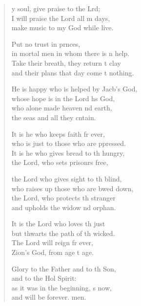 \settowidth{\versewidth}{He is happy who is helped by Jacob’s God, *}
\begin{verse}%
  \begin{patverse}
y soul, give praise to the Lrd;\Flex\\
I will praise the Lord all m days,\Med\\
make music to my God while  live.

Put no trust in prnces,\Med\\
in mortal men in whom there is n help.\\
Take their breath, they return t clay\Med\\
and their plans that day come t nothing.

He is happy who is helped by Jacb’s God,\Med\\
whose hope is in the Lord h\pointup{\i}s God,\\
who alone made heaven nd earth,\Med\\
the seas and all they cntain.

It is he who keeps faith fr ever,\Med\\
who is just to those who are ppressed.\\
It is he who gives bread to th hungry,\Med\\
the Lord, who sets prisonrs free,

the Lord who gives sight to th blind,\Med\\
who raises up those who are bwed down,\\
the Lord, who protects th stranger\Med\\
and upholds the widow nd orphan.

It is the Lord who loves th just\Med\\
but thwarts the path of th wicked.\\
The Lord will reign fr ever,\Med\\
Zion’s God, from age t age.

Glory to the Father and to th Son,\Med\\
and to the Hol Spirit:\\
as it was in the beginning, \pointup{\i}s now,\Med\\
and will be forever. men. 
  \end{patverse}
\end{verse}
